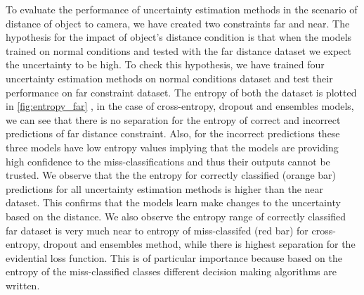 To evaluate the performance of uncertainty estimation methods in the scenario of distance of object to camera, we have created two constraints far and near. The hypothesis for the impact of object's distance condition is that when the models trained on normal conditions and tested with the far distance dataset we expect the uncertainty to be high. To check this hypothesis, we have trained four uncertainty estimation methods on normal conditions dataset and test their performance on far constraint dataset. The entropy of both the dataset is plotted in \cref{fig:entropy_far}
, in the case of cross-entropy, dropout and ensembles models, we can see that there is no separation for the entropy of correct and incorrect predictions of far distance constraint. Also, for the incorrect predictions these three models have low entropy values implying that the models are providing high confidence to the miss-classifications and thus their outputs cannot be trusted. 
We observe that the the entropy for correctly classified (orange bar) predictions for all uncertainty estimation methods is higher than the near dataset. This confirms that the models learn make changes to the uncertainty based on the distance. We also observe the entropy range of correctly classified far dataset is very much near to entropy of miss-classifed (red bar) for cross-entropy, dropout and ensembles method, while there is highest separation for the evidential loss function. This is of particular importance because based on the entropy of the miss-classified classes different decision making algorithms are written.

